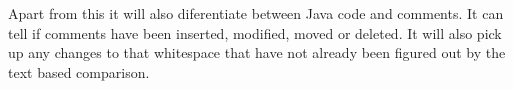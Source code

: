 Apart from this it will also diferentiate between Java code and comments.  It can tell if comments have been inserted, modified, moved or deleted.  It will also pick up any changes to that whitespace that have not already been figured out by the text based comparison.  

 
% 


% 
% 
% 
% 
% 
% 



